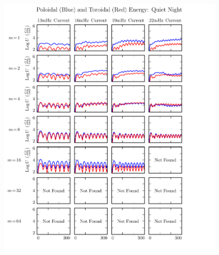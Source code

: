 \begin{figure}[!htb]
    \centering
    \includegraphics[width=\textwidth]{figures/U_night.pdf}
    \caption[Nightside Poloidal and Toroidal Energy]{
      \todo{$\cdots$}
    }
    \label{fig_U_night}
\end{figure}


